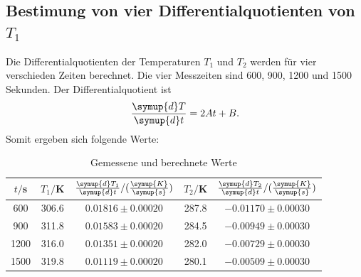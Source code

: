 \subsection{Bestimung von vier Differentialquotienten von $T_1$}
Die Differentialquotienten der Temperaturen $T_1$ und $T_2$ werden für vier verschieden
Zeiten berechnet. Die vier Messzeiten sind 600, 900, 1200 und 1500 Sekunden. Der
Differentialquotient ist
\begin{equation}
  \frac{\symup{d}T}{\symup{d}t} = 2At + B .
\end{equation}
Somit ergeben sich folgende Werte:
\begin{table}
  \centering
  \caption{Gemessene und berechnete Werte}
  \label{tab:Parameter}
  \begin{tabular}{c c c c c}
    \toprule
    $t/$s & $T_1/$K & $\frac{\symup{d}T_1}{\symup{d}t}/(\frac{\symup{K}}{\symup{s}})$ & $T_2/$K & $\frac{\symup{d}T_2}{\symup{d}t}/(\frac{\symup{K}}{\symup{s}})$  \\
    \midrule
      600 & 306.6 & $0.01816 \pm 0.00020$ & 287.8 & $-0.01170 \pm 0.00030$ \\
      900 & 311.8 & $0.01583 \pm 0.00020$ & 284.5 & $-0.00949 \pm 0.00030$ \\
      1200 & 316.0 & $0.01351 \pm 0.00020$ & 282.0 & $-0.00729 \pm 0.00030$ \\
      1500 & 319.8 & $0.01119 \pm 0.00020$ & 280.1 & $-0.00509 \pm 0.00030$ \\
   \bottomrule
 \end{tabular}
\end{table}

